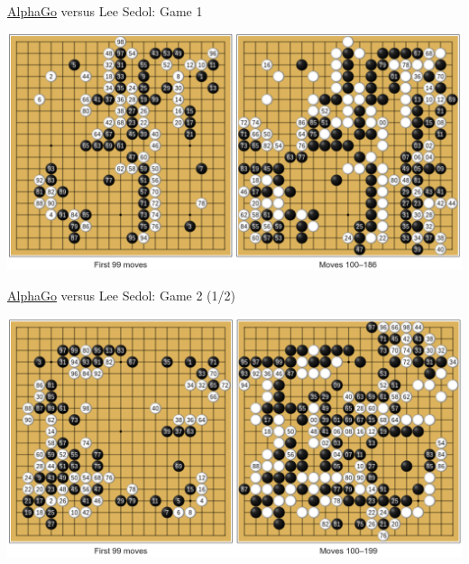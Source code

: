 \documentclass{beamer}
\begin{document}
  {

    \begin{frame}{{\color{white}\underline{AlphaGo}} versus {\color{black}Lee Sedol}: Game 1}
      \begin{center}
        \includegraphics[width=\textwidth]{../img/AlphaGo_vs_Lee_Sedol_Game_1.png}
      \end{center}
    \end{frame}

    \begin{frame}{{\color{black}\underline{AlphaGo}} versus {\color{white}Lee Sedol}: Game 2 (1/2)}
      \begin{center}
        \includegraphics[width=\textwidth]{../img/AlphaGo_vs_Lee_Sedol_Game_2a.png}
      \end{center}
    \end{frame}

}
\end{document}
